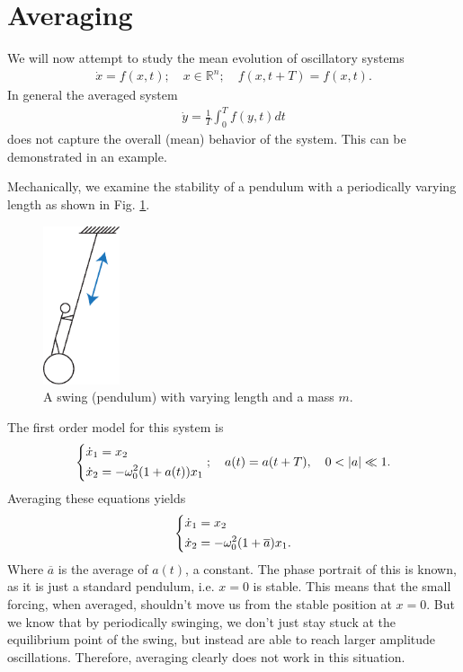 \section{Averaging}
We will now attempt to study the mean evolution of oscillatory systems
\begin{align}
	\dot{x} = f(x,t);\quad x \in \mathbb{R}^{n};\quad f(x,t+T) = f(x,t).
\end{align}
In general the averaged system
\begin{align}
	\dot{y} = \frac{1}{T} \int_{0}^{T} f(y,t)dt	
\end{align}
does not capture the overall (mean) behavior of the system. This can be demonstrated in an example.
\begin{ex}
	Mechanically, we examine the stability of a pendulum with a periodically varying length as shown in Fig. \ref{fig:swing_drawing}.
	\begin{figure}[h!]
		\centering
		\includegraphics[width=0.2\textwidth]{figures/ch5/2swing_drawing.pdf}
		\caption{A swing (pendulum) with varying length and a mass $m$.}
		\label{fig:swing_drawing}
	\end{figure}
	The first order model for this system is
	\begin{align}
		\begin{dcases}
			\dot{x}_1 = x_2\\
			\dot{x}_2 = -\omega_0^2 (1+a(t))x_1
		\end{dcases}
		;\quad a(t) = a(t+T),\quad 0<|a|\ll 1.	
	\end{align}
Averaging these equations yields
\begin{align}
	\begin{dcases}
		\dot{x}_1 = x_2 \\
		\dot{x}_2 = -\omega_0^2(1+ \overline{a})x_1.
	\end{dcases}
\end{align}
Where $\overline{a}$ is the average of $a(t)$, a constant. The phase portrait of this is known, as it is just a standard pendulum, i.e. $x=0$ is stable. This means that the small forcing, when averaged, shouldn't move us from the stable position at $x=0$. But we know that by periodically swinging, we don't just stay stuck at the equilibrium point of the swing, but instead are able to reach larger amplitude oscillations. Therefore, averaging clearly does not work in this situation. 
\end{ex}

